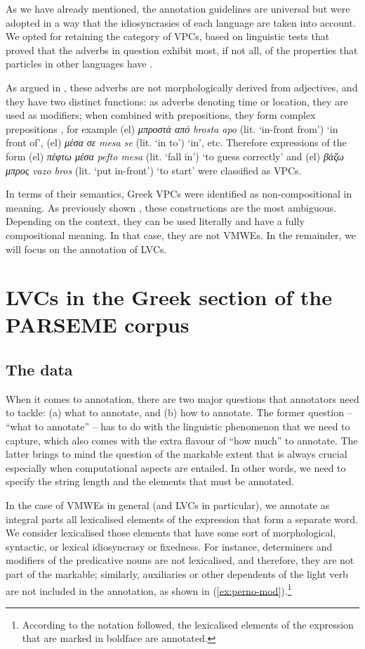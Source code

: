 \documentclass[output=paper,colorlinks,citecolor=brown]{langscibook}
\begin{document}
As we have already mentioned, the annotation guidelines are universal but were adopted in a way that the idiosyncrasies of each language are taken into account. We opted for retaining the category of VPCs, based on linguistic tests that proved that the adverbs in question exhibit most, if not all, of the properties that particles in other languages have \citep{giouliannotating}.


As argued in \citet{giouli-et-al-2024}, these adverbs are not morphologically derived from adjectives, and they have two distinct functions: as adverbs denoting time or location, they are used as modifiers; when combined with prepositions, they form complex prepositions \citep{holton_etal_1997}, for example (el) \textit{μπροστά από} \textit{brosta apo} (lit. `in-front from') `in front of', (el) \textit{μέσα σε} \textit{mesa se} (lit. `in to') `in', etc. Therefore expressions of the form (el) \textit{πέφτω μέσα} \textit{pefto mesa} (lit. `fall in') `to guess correctly' and (el) \textit{βάζω μπρος} \textit{vazo bros} (lit. `put in-front') `to start' were classified as VPCs.  


In terms of their semantics, Greek VPCs were identified as non-compositional in meaning. As previously shown \citep{savary_etal_2019}, these constructions are the most ambiguous. Depending on the context, they can be used literally and have a fully compositional meaning. In that case, they are not VMWEs. In the remainder, we will focus on the annotation of LVCs.

\section{LVCs in the Greek section of the PARSEME corpus}
\label{sec:results}
\subsection{The data}
When it comes to annotation, there are two major questions that annotators need to tackle: (a) what to annotate, and (b) how to annotate. The former question -- ``what to annotate'' -- has to do with the linguistic phenomenon that we need to capture, which also comes with the extra flavour of ``how much'' to annotate. The latter brings to mind the question of the markable extent that is always crucial \textemdash especially when computational aspects are entailed. In other words, we need to specify the string length and the elements that must be annotated. 


In the case of VMWEs in general (and LVCs in particular), we annotate as integral parts all lexicalised elements of the expression that form a separate word. We consider lexicalised those elements that have some sort of morphological, syntactic, or lexical idiosyncrasy or fixedness. For instance, determiners and modifiers of the predicative nouns are not lexicalised, and therefore, they are not part of the markable; similarly, auxiliaries or other dependents of the light verb are not included in the annotation, as shown in (\ref{ex:perno-mod}).\footnote{According to the notation followed, the lexicalised elements of the expression that are marked in boldface are annotated.}
\end{document}
